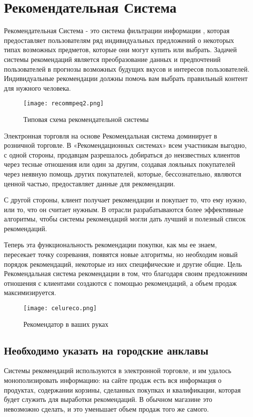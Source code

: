 \clearpage
\section{Рекомендательная Система}

Рекомендательная Система  - это система фильтрации информации \cite{recommender_system,filtering_system}, которая предоставляет пользователям ряд индивидуальных предложений о некоторых типах возможных предметов, которые они могут купить или выбрать. Задачей системы рекомендаций является преобразование данных и предпочтений пользователей в прогнозы возможных будущих вкусов и интересов пользователей. Индивидуальные рекомендации должны помочь вам выбрать правильный контент для нужного человека. 


\begin{figure}[h]
  \centering
  \texttt{[image: recommpeq2.png]}
  \caption{Типовая схема рекомендательной системы}
  \label{image:}
\end{figure}


Электронная торговля на основе Рекомендальная система доминирует в розничной торговле. В «Рекомендационных системах» всем участникам выгодно, с одной стороны, продавцам разрешалось добираться до неизвестных клиентов через тесные отношения или один за другим, создавая лояльных покупателей через неявную помощь других покупателей, которые, бессознательно, являются ценной частью, предоставляет данные для рекомендации.

С другой стороны, клиент получает рекомендации и покупает то, что ему нужно, или то, что он считает нужным. В отрасли разрабатываются более эффективные алгоритмы, чтобы системы рекомендаций могли дать лучший и полезный список рекомендаций.

Теперь эта функциональность рекомендации покупки, как мы ее знаем, пересекает точку созревания, появятся новые алгоритмы, но необходим новый порядок рекомендаций, некоторые из них специфические и другие общие. Цель Рекомендальная система рекомендации в том, что благодаря своим предложениям отношения с клиентами создаются с помощью рекомендаций, а объем продаж максимизируется.

\begin{figure}[h]
  \centering
  \texttt{[image: celureco.png]}
  \caption{Рекомендатор в ваших руках}
  \label{image:2}
\end{figure}
\newpage

\subsection{Необходимо указать на городские анклавы} Системы рекомендаций используются в электронной торговле, и им удалось монополизировать информацию: на сайте продаж есть вся информация о продуктах, содержании корзины, сделанных покупках и квалификации, которая будет служить для выработки рекомендаций. В обычном магазине это невозможно сделать, и это уменьшает объем продаж того же самого.

